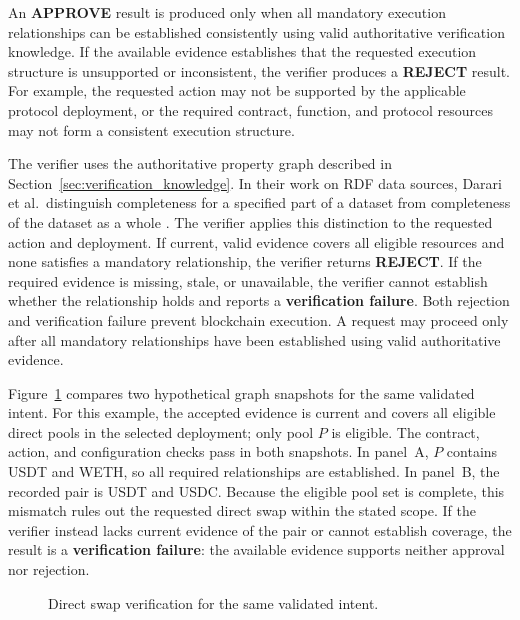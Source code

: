 An \textbf{APPROVE} result is produced only when all mandatory execution
relationships can be established consistently using valid authoritative
verification knowledge. If the available evidence establishes that the requested execution structure
is unsupported or inconsistent, the verifier produces a \textbf{REJECT}
result. For example, the requested action may not be supported by the
applicable protocol deployment, or the required contract, function, and
protocol resources may not form a consistent execution structure.

The verifier uses the authoritative property graph described in
Section~\ref{sec:verification_knowledge}. In their work on RDF data
sources, Darari et al.\ distinguish completeness for a specified part
of a dataset from completeness of the dataset as a whole
\cite{darari2013completeness}. The verifier applies this distinction
to the requested action and deployment. If current, valid evidence
covers all eligible resources and none satisfies a mandatory
relationship, the verifier returns \textbf{REJECT}. If the required
evidence is missing, stale, or unavailable, the verifier cannot establish
whether the relationship holds and reports a \textbf{verification failure}.
Both rejection and verification failure prevent blockchain execution.
A request may proceed only after all mandatory relationships have been
established using valid authoritative evidence.

Figure~\ref{fig:verification_outcome_examples} compares two hypothetical
graph snapshots for the same validated intent. For this example, the
accepted evidence is current and covers all eligible direct pools in the
selected deployment; only pool $P$ is eligible. The contract, action, and
configuration checks pass in both snapshots. In panel~A, $P$ contains USDT
and WETH, so all required relationships are established. In panel~B, the
recorded pair is USDT and USDC. Because the eligible pool set is complete,
this mismatch rules out the requested direct swap within the stated scope.
If the verifier instead lacks current evidence of the pair or cannot
establish coverage, the result is a \textbf{verification failure}: the
available evidence supports neither approval nor rejection.

\begin{figure}[H]
    \centering
    \resizebox{0.98\linewidth}{!}{%
    }
    \caption{Direct swap verification for the same validated intent.}
    \label{fig:verification_outcome_examples}
\end{figure}

